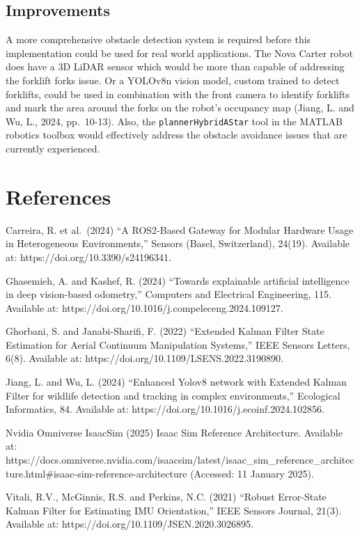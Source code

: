 \documentclass[
  letterpaper,
  DIV=11,
  numbers=noendperiod]{scrartcl}
\begin{document}
\hypertarget{improvements}{%
\subsection{Improvements}\label{improvements}}

A more comprehensive obstacle detection system is required before this
implementation could be used for real world applications. The Nova
Carter robot does have a 3D LiDAR sensor which would be more than
capable of addressing the forklift forks issue. Or a YOLOv8n vision
model, custom trained to detect forklifts, could be used in combination
with the front camera to identify forklifts and mark the area around the
forks on the robot's occupancy map (Jiang, L. and Wu, L., 2024,
pp.~10-13). Also, the \texttt{plannerHybridAStar} tool in the MATLAB
robotics toolbox would effectively address the obstacle avoidance issues
that are currently experienced.

\hypertarget{references}{%
\section*{References}\label{references}}

Carreira, R. et al.~(2024) ``A ROS2-Based Gateway for Modular Hardware
Usage in Heterogeneous Environments,'' Sensors (Basel, Switzerland),
24(19). Available at: https://doi.org/10.3390/s24196341.

Ghasemieh, A. and Kashef, R. (2024) ``Towards explainable artificial
intelligence in deep vision-based odometry,'' Computers and Electrical
Engineering, 115. Available at:
https://doi.org/10.1016/j.compeleceng.2024.109127.

Ghorbani, S. and Janabi-Sharifi, F. (2022) ``Extended Kalman Filter
State Estimation for Aerial Continuum Manipulation Systems,'' IEEE
Sensors Letters, 6(8). Available at:
https://doi.org/10.1109/LSENS.2022.3190890.

Jiang, L. and Wu, L. (2024) ``Enhanced Yolov8 network with Extended
Kalman Filter for wildlife detection and tracking in complex
environments,'' Ecological Informatics, 84. Available at:
https://doi.org/10.1016/j.ecoinf.2024.102856.

Nvidia Omniverse IsaacSim (2025) Isaac Sim Reference Architecture.
Available at:
https://docs.omniverse.nvidia.com/isaacsim/latest/isaac\_sim\_reference\_architecture.html\#isaac-sim-reference-architecture
(Accessed: 11 January 2025).

Vitali, R.V., McGinnis, R.S. and Perkins, N.C. (2021) ``Robust
Error-State Kalman Filter for Estimating IMU Orientation,'' IEEE Sensors
Journal, 21(3). Available at: https://doi.org/10.1109/JSEN.2020.3026895.
\end{document}
